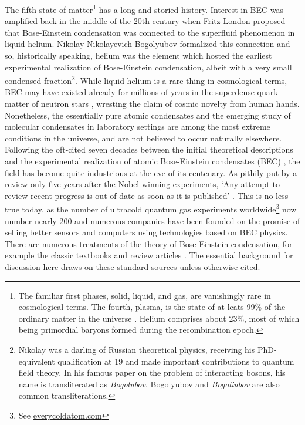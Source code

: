 	The fifth state of matter\footnote{The familiar first phases, solid, liquid, and gas, are vanishingly rare in cosmological terms.
	The fourth, plasma, is the state of at leats 99\% of the ordinary matter in the universe \cite{Plasmastuff}.
	Helium comprises about 23\%, most of which being primordial baryons formed during the recombination epoch.}  has a long and storied history\cite{Mukundanote}.
	Interest in BEC was amplified back in the middle of the 20th century when Fritz London proposed that Bose-Einstein condensation was connected to the superfluid phenomenon in liquid helium.
	Nikolay Nikolayevich Bogolyubov formalized this connection and so, historically speaking, helium was the element which hosted the earliest experimental realization of Bose-Einstein condensation, albeit with a very small condensed fraction\footnote{Nikolay was a darling of Russian theoretical physics, receiving his PhD-equivalent qualification at 19 and made important contributions to quantum field theory. In his famous paper on the problem of interacting bosons, his name is transliterated as \emph{Bogolubov}. Bogolyubov and \emph{Bogoliubov} are also common transliterations.}.
	While liquid helium is a rare thing in cosmological terms, BEC may have existed already for millions of years in the superdense quark matter of neutron stars \cite{Haskell18, Martin16,Baym69,Page11}, wresting the claim of cosmic novelty from human hands. 
	Nonetheless, the essentially pure atomic condensates and the emerging study of molecular condensates in laboratory settings are among the most extreme conditions in the universe, and are not believed to occur naturally elsewhere.
	Following the oft-cited seven decades between the initial theoretical descriptions and the experimental realization of atomic Bose-Einstein condensates (BEC) \cite{Davis95,Bradley95,Anderson95}, the field has become quite industrious at the eve of its centenary.
	As pithily put by a review only five years after the Nobel-winning experiments, `Any attempt to review recent progress is out of date as soon as it is published' \cite{Courteille01}.
	This is no less true today, as the number of ultracold quantum gas experiments worldwide\footnote{See \url{everycoldatom.com}} now number nearly 200 and numerous companies have been founded on the promise of selling better sensors and computers using technologies based on BEC physics.
	There are numerous treatments of the theory of Bose-Einstein condensation, for example the classic textbooks \cite{PitaevskiiStringari,PethickSmith} and review articles \cite{Dalfovo99, Yukalov11_basics,Courteille01}.
	The essential background for discussion here draws on these standard sources unless otherwise cited.


